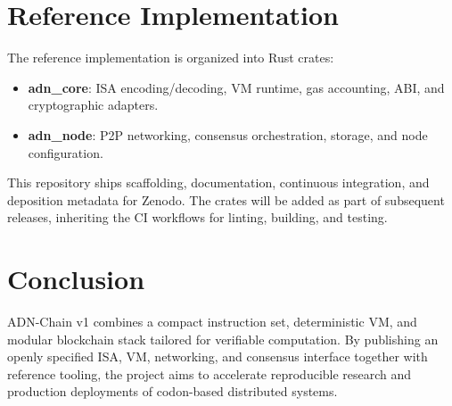 \documentclass[11pt]{article}
\begin{document}
\section{Reference Implementation}
The reference implementation is organized into Rust crates:
\begin{itemize}[noitemsep]
  \item \textbf{adn_core}: ISA encoding/decoding, VM runtime, gas accounting, ABI, and cryptographic adapters.
  \item \textbf{adn_node}: P2P networking, consensus orchestration, storage, and node configuration.
\end{itemize}

This repository ships scaffolding, documentation, continuous integration, and deposition metadata for Zenodo. The crates will be added as part of subsequent releases, inheriting the CI workflows for linting, building, and testing.

\section{Conclusion}
ADN-Chain v1 combines a compact instruction set, deterministic VM, and modular blockchain stack tailored for verifiable computation. By publishing an openly specified ISA, VM, networking, and consensus interface together with reference tooling, the project aims to accelerate reproducible research and production deployments of codon-based distributed systems.
\end{document}
